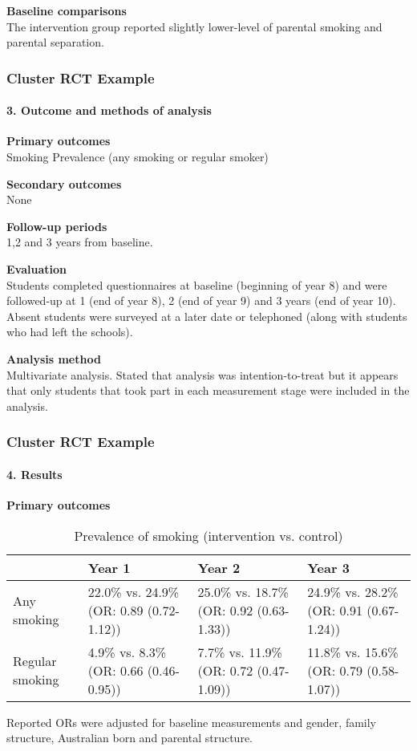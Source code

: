 \documentclass[table,10pt]{beamer}
\begin{document}
\begin{CJK*}{UTF8}{gbsn}
\begin{frame}[t]
\textbf{Baseline comparisons}\\
The intervention group reported slightly lower-level of parental smoking 
and parental separation.   
\end{frame}

\begin{frame}[t]
\frametitle{Cluster RCT Example}
\framesubtitle{3. Outcome and methods of analysis}
\footnotesize
\textbf{Primary outcomes}\\
Smoking Prevalence (any smoking or regular smoker)

\textbf{Secondary outcomes}\\
None

\textbf{Follow-up periods}\\
1,2 and 3 years from baseline.

\textbf{Evaluation}\\
Students completed questionnaires at baseline (beginning of year 8) and 
were followed-up at 1 (end of year 8), 2 (end of year 9) and 3 years (end 
of year 10). Absent students were surveyed at a later date or telephoned 
(along with students who had left the schools).

\textbf{Analysis method}\\
Multivariate analysis. Stated that analysis was intention-to-treat but it 
appears that only students that took part in each measurement stage were 
included in the analysis.
\end{frame}


\begin{frame}[t]
\frametitle{Cluster RCT Example}
\framesubtitle{4. Results}
\footnotesize
\textbf{Primary outcomes}\\
\begin{table}
\caption{Prevalence of smoking (intervention vs. control)}
\begin{tabular}{lp{}p{}p{}}
\hline
  & Year 1 & Year 2 & Year 3\\
\hline
Any smoking & 22.0\% vs. 24.9\% (OR: 0.89 (0.72-1.12)) & 25.0\% vs. 18.7\% (OR: 0.92 (0.63-1.33)) & 24.9\% vs. 28.2\% (OR: 0.91 (0.67-1.24))\\
\hline 
Regular smoking & 4.9\% vs. 8.3\% (OR: 0.66 (0.46-0.95)) & 7.7\% vs. 11.9\% (OR: 0.72 (0.47-1.09)) & 11.8\% vs. 15.6\% (OR: 0.79 (0.58-1.07))\\
\hline
\end{tabular}
\end{table}
Reported ORs were adjusted for baseline measurements and gender, family 
structure, Australian born and parental structure.
\end{frame}


\end{CJK*}
\end{document}
